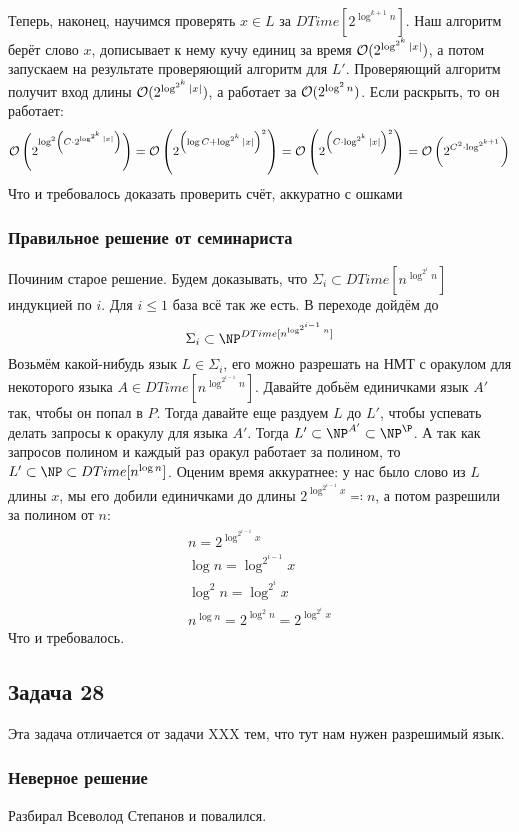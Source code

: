 		Теперь, наконец, научимся проверять $x \in L$ за $DTime[2^{\log^{k+1} n}]$.
		Наш алгоритм берёт слово $x$, дописывает к нему кучу единиц за время $\mathcal O(2^{\log^{2^k} |x|})$,
		а потом запускаем на результате проверяющий алгоритм для $L'$.
		Проверяющий алгоритм получит вход длины $\mathcal O(2^{\log^{2^k} |x|})$, а работает
		за $\mathcal O(2^{\log^2 n})$.
		Если раскрыть, то он работает:
		\[
			\mathcal O\left(2^{\log^2 \left(C \cdot 2^{\log^{2^k} |x|}\right) }\right) =
			\mathcal O\left(2^{\left(\log C + \log^{2^k} |x|\right)^2}\right) =
			\mathcal O\left(2^{\left(C \cdot \log^{2^k} |x|\right)^2}\right) =
			\mathcal O\left(2^{C^2 \cdot \log^{2^{k+1}}}\right)
		\]
		Что и требовалось доказать
		\TODO проверить счёт, аккуратно с ошками

	\subsubsection{Правильное решение от семинариста}
		Починим старое решение.
		Будем доказывать, что $\Sigma_i \subset DTime[n^{\log^{2^i} n}]$ индукцией по $i$.
		Для $i \le 1$ база всё так же есть.
		В переходе дойдём до
		\[ \Sigma_i \subset \NP^{DTime[n^{\log^{2^{i-1}} n}]} \]
		Возьмём какой-нибудь язык $L\in\Sigma_i$, его можно разрешать на НМТ
		с оракулом для некоторого языка $A \in DTime[n^{\log^{2^{i-1}} n}]$.
		Давайте добьём единичками язык $A'$ так, чтобы он попал в $P$.
		Тогда давайте еще раздуем $L$ до $L'$, чтобы успевать делать запросы к оракулу
		для языка $A'$.
		Тогда $L' \subset \NP^{A'} \subset \NP^\P$.
		А так как запросов полином и каждый раз оракул работает за полином, то $L' \subset \NP \subset DTime[n^{\log n}]$.
		Оценим время аккуратнее: у нас было слово из $L$ длины $x$,
		мы его добили единичками до длины $2^{\log^{2^{i-1}} x} \eqcolon n$, а потом разрешили за полином от $n$:
		\begin{gather*}
			n = 2^{\log^{2^{i-1}} x} \\
			\log n = \log^{2^{i-1}} x \\
			\log^2 n = \log^{2^i} x \\
			n^{\log n} = 2^{\log^2n} = 2^{\log^{2^i} x}
		\end{gather*}
		Что и требовалось.

\subsection{Задача 28}
	Эта задача отличается от задачи XXX тем, что тут нам нужен разрешимый язык.
	\subsubsection{Неверное решение}
		Разбирал Всеволод Степанов и повалился.

